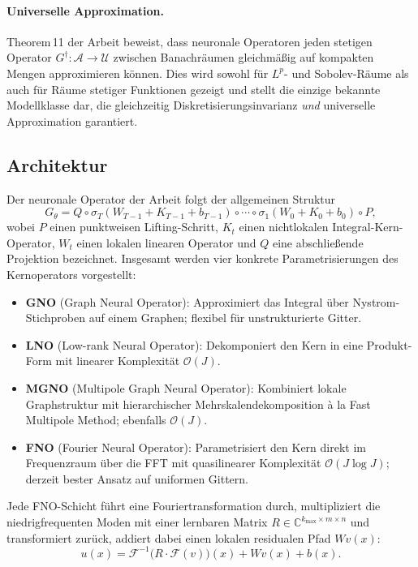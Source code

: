 \documentclass[a4paper,12pt]{article}
\begin{document}
\paragraph{Universelle Approximation.}
Theorem\,11 der Arbeit beweist, dass neuronale Operatoren jeden stetigen Operator
$G^\dagger: \mathcal{A} \to \mathcal{U}$ zwischen Banachräumen gleichmäßig auf
kompakten Mengen approximieren können. Dies wird sowohl für $L^p$- und
Sobolev-Räume als auch für Räume stetiger Funktionen gezeigt und stellt die
einzige bekannte Modellklasse dar, die gleichzeitig Diskretisierungsinvarianz
\emph{und} universelle Approximation garantiert.

\subsection*{Architektur}

Der neuronale Operator der Arbeit folgt der allgemeinen Struktur
\[
  G_\theta = Q \circ \sigma_T(W_{T-1} + K_{T-1} + b_{T-1})
              \circ \cdots \circ
              \sigma_1(W_0 + K_0 + b_0) \circ P,
\]
wobei $P$ einen punktweisen Lifting-Schritt, $K_t$ einen nichtlokalen
Integral-Kern-Operator, $W_t$ einen lokalen linearen Operator und $Q$
eine abschließende Projektion bezeichnet.
Insgesamt werden vier konkrete Parametrisierungen des Kernoperators vorgestellt:

\begin{itemize}
  \item \textbf{GNO} (Graph Neural Operator): Approximiert das Integral über
        Nystrom-Stichproben auf einem Graphen; flexibel für unstrukturierte Gitter.
  \item \textbf{LNO} (Low-rank Neural Operator): Dekomponiert den Kern in eine
        Produkt-Form mit linearer Komplexität $\mathcal{O}(J)$.
  \item \textbf{MGNO} (Multipole Graph Neural Operator): Kombiniert lokale
        Graphstruktur mit hierarchischer Mehrskalendekomposition à la Fast
        Multipole Method; ebenfalls $\mathcal{O}(J)$.
  \item \textbf{FNO} (Fourier Neural Operator): Parametrisiert den Kern direkt
        im Frequenzraum über die FFT mit quasilinearer Komplexität
        $\mathcal{O}(J \log J)$; derzeit bester Ansatz auf uniformen Gittern.
\end{itemize}

Jede FNO-Schicht führt eine Fouriertransformation durch, multipliziert die
niedrigfrequenten Moden mit einer lernbaren Matrix $R \in \mathbb{C}^{k_\text{max}
\times m \times n}$ und transformiert zurück, addiert dabei einen lokalen
residualen Pfad $W v(x)$:
\[
  u(x) = \mathcal{F}^{-1}\!\bigl(R \cdot \mathcal{F}(v)\bigr)(x) + W v(x) + b(x).
\]
\end{document}
